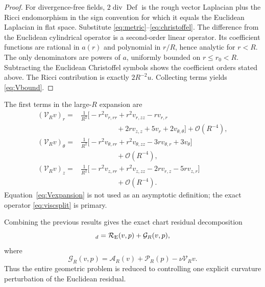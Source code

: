 \documentclass[aps,prd,reprint,superscriptaddress,nofootinbib,floatfix]{revtex4-2}
\theoremstyle{definition}
\theoremstyle{remark}
\newcommand{\Def}{\operatorname{Def}}
\newcommand{\cR}{\mathcal{R}}
\newcommand{\cG}{\mathcal{G}}
\newcommand{\cA}{\mathcal{A}}
\newcommand{\cP}{\mathcal{P}}
\newcommand{\cV}{\mathcal{V}}
\newcommand{\OO}{\mathcal{O}}
\begin{document}
\begin{proof}
	For divergence-free fields, $2\operatorname{div}\Def$ is the rough vector Laplacian plus the Ricci endomorphism in the sign convention for which it equals the Euclidean Laplacian in flat space. Substitute \cref{eq:metric}--\eqref{eq:christoffel}. The difference from the Euclidean cylindrical operator is a second-order linear operator. Its coefficient functions are rational in $a(r)$ and polynomial in $r/R$, hence analytic for $r<R$. The only denominators are powers of $a$, uniformly bounded on $r\le r_0<R$. Subtracting the Euclidean Christoffel symbols shows the coefficient orders stated above. The Ricci contribution is exactly $2R^{-2}u$. Collecting terms yields \cref{eq:Vbound}.
\end{proof}

The first terms in the large-$R$ expansion are
\begin{align}
	(\cV_Rv)_r={}      & \frac1{R^2}\big[-r^2v_{r,rr}+r^2v_{r,zz}
	-rv_{r,r}\nonumber                                                             \\
	                   & \qquad\qquad\quad +2rv_{z,z}+5v_r+2v_{\theta,\theta}\big]
	+\OO(R^{-4}),\nonumber                                                         \\
	(\cV_Rv)_\theta={} & \frac1{R^2}\big[-r^2v_{\theta,rr}+r^2v_{\theta,zz}
	-3rv_{\theta,r}+3v_\theta\big]\nonumber                                        \\
	                   & \qquad\qquad\quad+\OO(R^{-4}),\nonumber                   \\
	(\cV_Rv)_z={}      & \frac1{R^2}\big[-r^2v_{z,rr}+r^2v_{z,zz}
	-2rv_{r,z}-5rv_{z,r}\big]\nonumber                                             \\
	                   & \qquad\qquad\quad+\OO(R^{-4}).
	\label{eq:Vexpansion}
\end{align}
Equation~\eqref{eq:Vexpansion} is not used as an asymptotic definition; the exact operator \cref{eq:viscsplit} is primary.

Combining the previous results gives the exact chart residual decomposition
\begin{equation}
	[\cR_{g_R}(u,p)]_d=\cR_{\rm E}(v,p)+\cG_R(v,p),
	\label{eq:residualsplit}
\end{equation}
where
\begin{equation}
	\cG_R(v,p)=\cA_R(v)+\cP_R(p)-\nu\cV_Rv.
	\label{eq:Gdef}
\end{equation}
Thus the entire geometric problem is reduced to controlling one explicit curvature perturbation of the Euclidean residual.
\end{document}
